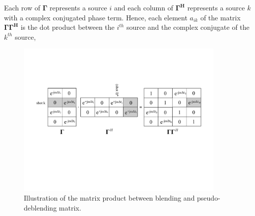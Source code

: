 Each row of $\mathbf{\Gamma}$ represents a source $i$ and each column of $\mathbf{\Gamma ^H}$ represents a source $k$ with a complex conjugated phase term. Hence, each element $a_{ik}$ of the matrix $\mathbf{\Gamma \Gamma^H}$ is the dot product between the $i^{th}$ source and the complex conjugate of the $k^{th}$ source,



\begin{figure}
	\centering
	\includegraphics[width = 0.9\textwidth]{Plots/GGH}
	\caption{Illustration of the matrix product between blending and pseudo-deblending matrix.}
	\label{fig:Ch-Theory	-GGH}
\end{figure}

